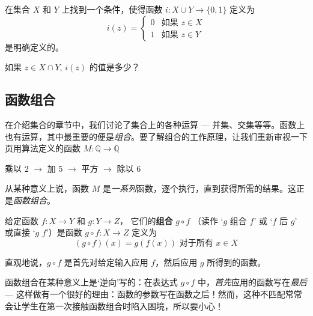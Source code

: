 \begin{exercise}
\label{exWellDefinednessOfFunctionOnUnion}
在集合 $X$ 和 $Y$ 上找到一个条件，使得函数 $i : X \cup Y \to \{ 0, 1 \}$ 定义为
\[ i(z) = \begin{cases} 0 & \text{如果 } z \in X \\ 1 & \text{如果 } z \in Y \end{cases} \]
是明确定义的。
\begin{backhint}
如果 $z \in X \cap Y$, $i(z)$ 的值是多少？
\end{backhint}
\end{exercise}

\subsection*{函数组合}

在介绍集合的章节中，我们讨论了集合上的各种运算 --- 并集、交集等等。函数上也有运算，其中最重要的便是\textit{组合}。要了解组合的工作原理，让我们重新审视一下 \pageref{txtAlgorithmicallyDefinedFunctionExample} 页用算法定义的函数 $M : \mathbb{Q} \to \mathbb{Q}$
\begin{center}
乘以 $2$ $\to$ 加 $5$ $\to$ 平方 $\to$ 除以 $6$
\end{center}
从某种意义上说，函数 $M$ 是\textit{一系列}函数，逐个执行，直到获得所需的结果。这正是\textit{函数组合}。

\begin{definition}
\label{defComposition} \label{defComposite}
给定函数 $f : X \to Y$ 和 $g : Y \to Z$， 它们的\textbf{组合} $g \circ f$  （读作 `$g$ 组合 $f$' 或 `$f$ 后 $g$' 或直接 `$g$ $f$'）是函数 $g \circ f : X \to Z$ 定义为
\[ (g \circ f)(x) = g(f(x)) \text{ 对于所有 } x \in X \]
\end{definition}
直观地说，$g \circ f$ 是首先对给定输入应用 $f$，然后应用 $g$ 所得到的函数。

\begin{commonerror}
函数组合在某种意义上是`逆向'写的：在表达式 $g \circ f$ 中，\textit{首先}应用的函数写在\textit{最后} --- 这样做有一个很好的理由：函数的参数写在函数之后！然而，这种不匹配常常会让学生在第一次接触函数组合时陷入困境，所以要小心！
\end{commonerror}

